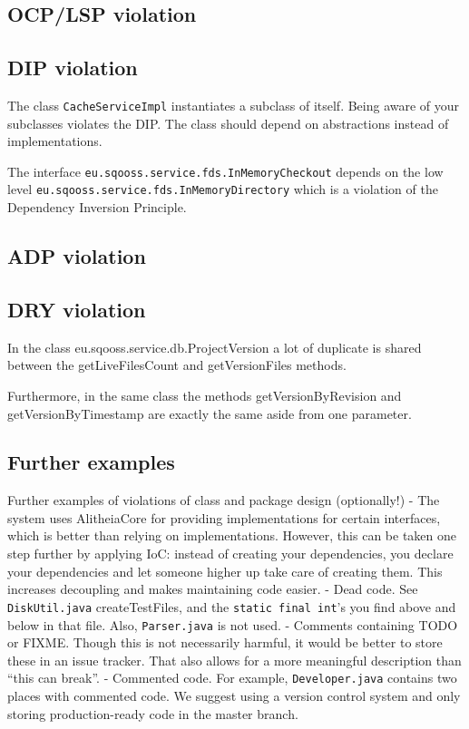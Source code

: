 \documentclass{article}
\begin{document}
\subsection{OCP/LSP violation}

\subsection{DIP violation}
The class \verb|CacheServiceImpl| instantiates a subclass of itself. Being aware of your subclasses violates the DIP. The class should depend on abstractions instead of implementations.

The interface \verb|eu.sqooss.service.fds.InMemoryCheckout| depends on the low level \verb|eu.sqooss.service.fds.InMemoryDirectory| which is a violation of the Dependency Inversion Principle. %

\subsection{ADP violation}

\subsection{DRY violation}
In the class eu.sqooss.service.db.ProjectVersion a lot of duplicate is shared between the getLiveFilesCount and getVersionFiles methods. 

Furthermore, in the same class the methods getVersionByRevision and getVersionByTimestamp are exactly the same aside from one parameter.


\subsection{Further examples}
Further examples of violations of class and package design (optionally!)
 - The system uses AlitheiaCore for providing implementations for certain interfaces, which is better than relying on implementations. However, this can be taken one step further by applying IoC: instead of creating your dependencies, you declare your dependencies and let someone higher up take care of creating them. This increases decoupling and makes maintaining code easier.
 - Dead code. See \verb|DiskUtil.java| createTestFiles, and the \verb|static final int|'s you find above and below in that file. Also, \verb|Parser.java| is not used.
 - Comments containing TODO or FIXME. Though this is not necessarily harmful, it would be better to store these in an issue tracker. That also allows for a more meaningful description than ``this can break''.
 - Commented code. For example, \verb|Developer.java| contains two places with commented code. We suggest using a version control system and only storing production-ready code in the master branch.



\end{document}
